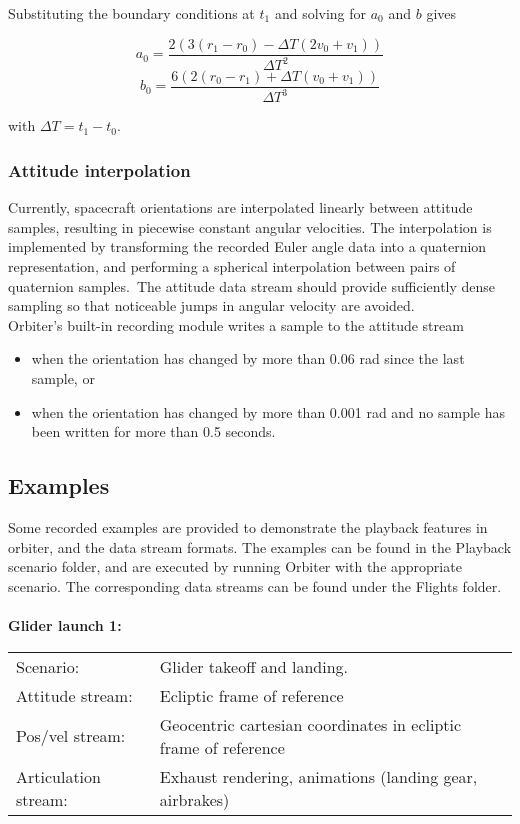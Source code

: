 \documentclass[Orbiter Technical Reference.tex]{subfiles}
\begin{document}
\noindent
Substituting the boundary conditions at $t_{1}$ and solving for $a_{0}$ and $b$ gives

\[ a_{0} = \frac{2(3(r_{1} - r_{0}) - \Delta T(2 v_{0} + v_{1}))}{\Delta T^{2}} \]
\[ b_{0} = \frac{6(2(r_{0} - r_{1}) + \Delta T(v_{0} + v_{1}))}{\Delta T^{3}} \]

\noindent
with $\Delta T = t_{1} - t_{0}$.


\subsubsection{Attitude interpolation}
Currently, spacecraft orientations are interpolated linearly between attitude samples, resulting in piecewise constant angular velocities. The interpolation is implemented by transforming the recorded Euler angle data into a quaternion representation, and performing a spherical interpolation between pairs of quaternion samples.\
The attitude data stream should provide sufficiently dense sampling so that noticeable jumps in angular velocity are avoided.\\
Orbiter's built-in recording module writes a sample to the attitude stream

\begin{itemize}
\item when the orientation has changed by more than 0.06 rad since the last sample, or
\item when the orientation has changed by more than 0.001 rad and no sample has been written for more than 0.5 seconds.
\end{itemize}


\subsection{Examples}
Some recorded examples are provided to demonstrate the playback features in orbiter, and the data stream formats. The examples can be found in the Playback scenario folder, and are executed by running Orbiter with the appropriate scenario. The corresponding data streams can be found under the Flights folder.\\
\\
\textbf{Glider launch 1:}
\begin{table}[H]
	\centering
	\begin{tabularx}{\textwidth}{ l X }
	Scenario: & Glider takeoff and landing.\\
	Attitude stream: & Ecliptic frame of reference\\
	Pos/vel stream: & Geocentric cartesian coordinates in ecliptic frame of reference\\
	Articulation stream: & Exhaust rendering, animations (landing gear, airbrakes)\\
	\end{tabularx}
\end{table}
\end{document}
